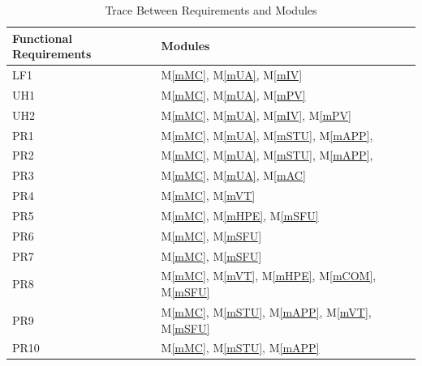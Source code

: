 \documentclass[12pt, titlepage]{article}
\newcommand{\mref}[1]{M\ref{#1}}
\begin{document}
\begin{table}[H]
\centering
\begin{tabular}{p{} p{}}
\toprule
\textbf{Functional Requirements} & \textbf{Modules}\\
\midrule
LF1 & \mref{mMC}, \mref{mUA}, \mref{mIV}\\
UH1 & \mref{mMC}, \mref{mUA}, \mref{mPV}\\
UH2 & \mref{mMC}, \mref{mUA}, \mref{mIV}, \mref{mPV}\\
PR1 & \mref{mMC}, \mref{mUA}, \mref{mSTU}, \mref{mAPP},\\
PR2 & \mref{mMC}, \mref{mUA}, \mref{mSTU}, \mref{mAPP},\\
PR3 & \mref{mMC}, \mref{mUA}, \mref{mAC}\\
PR4 & \mref{mMC}, \mref{mVT}\\
PR5 & \mref{mMC}, \mref{mHPE}, \mref{mSFU}\\
PR6 & \mref{mMC}, \mref{mSFU}\\
PR7 & \mref{mMC}, \mref{mSFU}\\
PR8 & \mref{mMC}, \mref{mVT}, \mref{mHPE}, \mref{mCOM}, \mref{mSFU}\\
PR9 & \mref{mMC}, \mref{mSTU}, \mref{mAPP}, \mref{mVT}, \mref{mSFU}\\
PR10 & \mref{mMC}, \mref{mSTU}, \mref{mAPP}\\
\bottomrule
\end{tabular}
\caption{Trace Between Requirements and Modules}
\label{TblRT}
\end{table}
\end{document}
